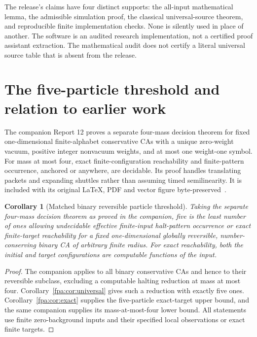 \documentclass[11pt,a4paper]{article}
\numberwithin{equation}{section}
\newtheorem{corollary}[theorem]{Corollary}
\begin{document}
The release's claims have four distinct supports: the all-input mathematical
lemma, the admissible simulation proof, the classical universal-source theorem,
and reproducible finite implementation checks. None is silently used in place
of another. The software is an audited research implementation, not a certified
proof assistant extraction. The mathematical audit does not certify a literal
universal source table that is absent from the release.

\section{The five-particle threshold and relation to earlier work}\label{fpa:sec:threshold}
The companion Report 12 proves a separate four-mass decision theorem for fixed
one-dimensional finite-alphabet conservative CAs with a unique zero-weight
vacuum, positive integer nonvacuum weights, and at most one weight-one symbol.
For mass at most four, exact finite-configuration reachability and finite-pattern
occurrence, anchored or anywhere, are decidable. Its proof handles translating
packets and expanding shuttles rather than assuming timed semilinearity.
It is included with its original \LaTeX{}, PDF and vector figure
byte-preserved~\cite{fpa:report12}.

\begin{corollary}[Matched binary reversible particle threshold]\label{fpa:cor:threshold}
Taking the separate four-mass decision theorem as proved in the companion,
five is the least number of ones allowing undecidable effective finite-input
halt-pattern occurrence or exact finite-target reachability for a fixed
one-dimensional globally reversible, number-conserving binary CA of arbitrary
finite radius. For exact reachability, both the initial and target
configurations are computable functions of the input.
\end{corollary}
\begin{proof}
The companion applies to all binary conservative CAs and hence to their
reversible subclass, excluding a computable halting reduction at mass at most
four. Corollary~\ref{fpa:cor:universal} gives such a reduction with exactly five
ones. Corollary~\ref{fpa:cor:exact} supplies the five-particle exact-target upper
bound, and the same companion supplies its mass-at-most-four lower bound.
All statements use finite zero-background inputs and their specified local
observations or exact finite targets.
\end{proof}
\end{document}
